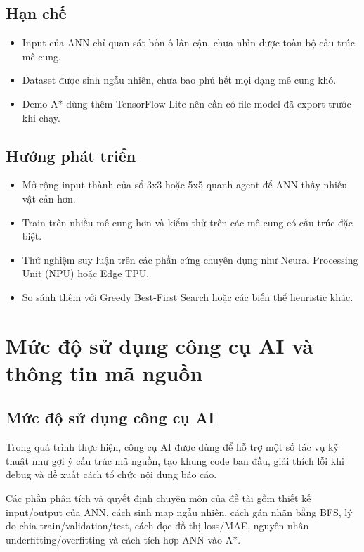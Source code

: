 \documentclass[12pt,a4paper]{article}
\begin{document}
\subsection{Hạn chế}

\begin{itemize}
    \item Input của ANN chỉ quan sát bốn ô lân cận, chưa nhìn được toàn bộ cấu trúc mê cung.
    \item Dataset được sinh ngẫu nhiên, chưa bao phủ hết mọi dạng mê cung khó.
    \item Demo A* dùng thêm TensorFlow Lite nên cần có file model đã export trước khi chạy.
\end{itemize}

\subsection{Hướng phát triển}

\begin{itemize}
    \item Mở rộng input thành cửa sổ 3x3 hoặc 5x5 quanh agent để ANN thấy nhiều vật cản hơn.
    \item Train trên nhiều mê cung hơn và kiểm thử trên các mê cung có cấu trúc đặc biệt.
    \item Thử nghiệm suy luận trên các phần cứng chuyên dụng như Neural Processing Unit (NPU) hoặc Edge TPU.
    \item So sánh thêm với Greedy Best-First Search hoặc các biến thể heuristic khác.
\end{itemize}

\section{Mức độ sử dụng công cụ AI và thông tin mã nguồn}

\subsection{Mức độ sử dụng công cụ AI}

Trong quá trình thực hiện, công cụ AI được dùng để hỗ trợ một số tác vụ kỹ thuật như gợi ý cấu trúc mã nguồn, tạo khung code ban đầu, giải thích lỗi khi debug và đề xuất cách tổ chức nội dung báo cáo.

Các phần phân tích và quyết định chuyên môn của đề tài gồm thiết kế input/output của ANN, cách sinh map ngẫu nhiên, cách gán nhãn bằng BFS, lý do chia train/validation/test, cách đọc đồ thị loss/MAE, nguyên nhân underfitting/overfitting và cách tích hợp ANN vào A*.
\end{document}
